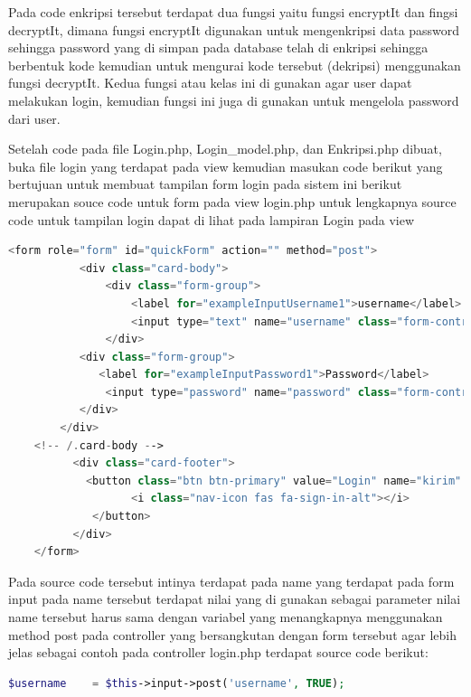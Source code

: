 Pada code enkripsi tersebut terdapat dua fungsi yaitu fungsi encryptIt dan fingsi decryptIt, dimana fungsi encryptIt digunakan untuk mengenkripsi data password sehingga password yang di simpan pada database telah di enkripsi sehingga berbentuk kode kemudian untuk mengurai kode tersebut (dekripsi) menggunakan fungsi decryptIt. Kedua fungsi atau kelas ini di gunakan agar user dapat melakukan login, kemudian fungsi ini juga di gunakan untuk mengelola password dari user.\par
	Setelah code pada file Login.php, Login\_model.php, dan Enkripsi.php dibuat, buka file login yang terdapat pada view kemudian masukan code berikut yang bertujuan untuk membuat tampilan form login pada sistem ini berikut merupakan souce code untuk form pada view login.php untuk lengkapnya source code untuk tampilan login dapat di lihat pada lampiran Login pada view\par

\begin{lstlisting}[language=PHP]
	<form role="form" id="quickForm" action="" method="post">  
	       <div class="card-body">  
	           <div class="form-group">  
	               <label for="exampleInputUsername1">username</label> 
	               <input type="text" name="username" class="form-control" id="exampleInputUsername1" placeholder="Enter username">  
	           </div>  
	       <div class="form-group">  
	          <label for="exampleInputPassword1">Password</label>  
	           <input type="password" name="password" class="form-control" id="exampleInputPassword1" placeholder="Password">  
	       </div>  
	    </div>  
	<!-- /.card-body -->  
	      <div class="card-footer">  
	        <button class="btn btn-primary" value="Login" name="kirim" type="submit">Sign in  
	               <i class="nav-icon fas fa-sign-in-alt"></i>  
	         </button>  
	      </div> 
	</form>  
\end{lstlisting}

Pada source code tersebut intinya terdapat pada name yang terdapat pada form input pada name tersebut terdapat nilai yang di gunakan sebagai parameter nilai name tersebut harus sama dengan variabel yang menangkapnya menggunakan method post pada controller yang bersangkutan dengan form tersebut agar lebih jelas sebagai contoh pada controller login.php terdapat source code berikut:\par

\begin{lstlisting}[language=PHP]
$username    = $this->input->post('username', TRUE);
\end{lstlisting}

